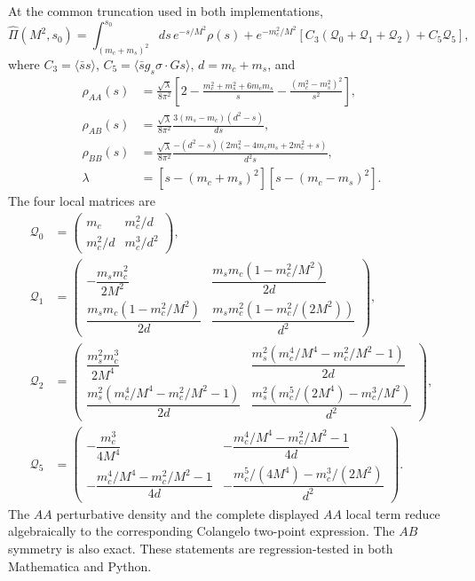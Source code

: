 \documentclass[11pt]{article}
\begin{document}
At the common truncation used in both implementations,
\begin{equation}
\widehat\Pi(M^2,s_0)=
\int_{(m_c+m_s)^2}^{s_0}ds\,e^{-s/M^2}\rho(s)
+e^{-m_c^2/M^2}\left[C_3(\mathcal Q_0+\mathcal Q_1+\mathcal Q_2)
+C_5\mathcal Q_5\right],
\label{eq:twopoint-matrix-final}
\end{equation}
where $C_3=\langle\bar ss\rangle$, $C_5=\langle\bar s g_s
\sigma\!\cdot\!G s\rangle$, $d=m_c+m_s$, and
\begin{align}
\rho_{AA}(s)&=\frac{\sqrt\lambda}{8\pi^2}\left[
2-\frac{m_c^2+m_s^2+6m_cm_s}{s}
-\frac{(m_c^2-m_s^2)^2}{s^2}\right],\\
\rho_{AB}(s)&=\frac{\sqrt\lambda}{8\pi^2}
\frac{3(m_s-m_c)(d^2-s)}{ds},\\
\rho_{BB}(s)&=\frac{\sqrt\lambda}{8\pi^2}
\frac{-(d^2-s)(2m_s^2-4m_cm_s+2m_c^2+s)}{d^2s},\\
\lambda&=[s-(m_c+m_s)^2][s-(m_c-m_s)^2].
\end{align}
The four local matrices are
\begin{align}
\mathcal Q_0&=
\begin{pmatrix}m_c&m_c^2/d\\m_c^2/d&m_c^3/d^2\end{pmatrix},\\
\mathcal Q_1&=
\begin{pmatrix}
-\dfrac{m_sm_c^2}{2M^2}&
\dfrac{m_sm_c(1-m_c^2/M^2)}{2d}\\
\dfrac{m_sm_c(1-m_c^2/M^2)}{2d}&
\dfrac{m_sm_c^2(1-m_c^2/(2M^2))}{d^2}
\end{pmatrix},\\
\mathcal Q_2&=
\begin{pmatrix}
\dfrac{m_s^2m_c^3}{2M^4}&
\dfrac{m_s^2(m_c^4/M^4-m_c^2/M^2-1)}{2d}\\
\dfrac{m_s^2(m_c^4/M^4-m_c^2/M^2-1)}{2d}&
\dfrac{m_s^2(m_c^5/(2M^4)-m_c^3/M^2)}{d^2}
\end{pmatrix},\\
\mathcal Q_5&=
\begin{pmatrix}
-\dfrac{m_c^3}{4M^4}&
-\dfrac{m_c^4/M^4-m_c^2/M^2-1}{4d}\\
-\dfrac{m_c^4/M^4-m_c^2/M^2-1}{4d}&
-\dfrac{m_c^5/(4M^4)-m_c^3/(2M^2)}{d^2}
\end{pmatrix}.
\end{align}
The $AA$ perturbative density and the complete displayed $AA$ local term
reduce algebraically to the corresponding Colangelo two-point expression.
The $AB$ symmetry is also exact.  These statements are regression-tested in
both Mathematica and Python.
\end{document}
